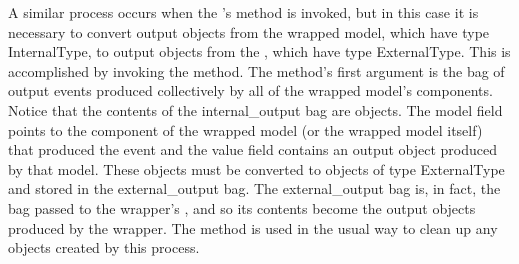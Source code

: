 A similar process occurs when the 's  method is invoked, but in this case it is necessary to convert output objects from the wrapped model, which have type InternalType, to output objects from the , which have type ExternalType. This is accomplished by invoking the  method. The method's first argument is the bag of output events produced collectively by all of the wrapped model's components. Notice that the contents of the internal\_output bag are  objects. The model field points to the component of the wrapped model (or the wrapped model itself) that produced the event and the value field contains an output object produced by that model. These  objects must be converted to objects of type ExternalType and stored in the external\_output bag. The external\_output bag is, in fact, the bag passed to the wrapper's , and so its contents become the output objects produced by the wrapper. The  method is used in the usual way to clean up any objects created by this process.

